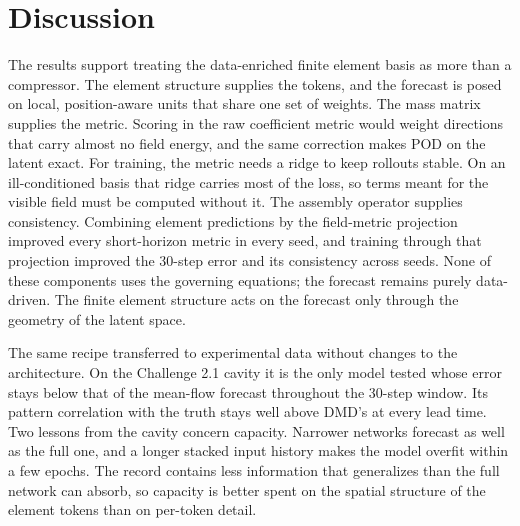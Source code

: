 \documentclass[conf]{new-aiaa}
\begin{document}
\section{Discussion}
\label{sec:discussion}
The results support treating the data-enriched finite element basis as more than a compressor. The element structure supplies the tokens, and the forecast is posed on local, position-aware units that share one set of weights. The mass matrix supplies the metric. Scoring in the raw coefficient metric would weight directions that carry almost no field energy, and the same correction makes POD on the latent exact. For training, the metric needs a ridge to keep rollouts stable. On an ill-conditioned basis that ridge carries most of the loss, so terms meant for the visible field must be computed without it. The assembly operator supplies consistency. Combining element predictions by the field-metric projection improved every short-horizon metric in every seed, and training through that projection improved the 30-step error and its consistency across seeds. None of these components uses the governing equations; the forecast remains purely data-driven. The finite element structure acts on the forecast only through the geometry of the latent space.

The same recipe transferred to experimental data without changes to the architecture. On the Challenge 2.1 cavity it is the only model tested whose error stays below that of the mean-flow forecast throughout the 30-step window. Its pattern correlation with the truth stays well above DMD's at every lead time. Two lessons from the cavity concern capacity. Narrower networks forecast as well as the full one, and a longer stacked input history makes the model overfit within a few epochs. The record contains less information that generalizes than the full network can absorb, so capacity is better spent on the spatial structure of the element tokens than on per-token detail.
\end{document}
